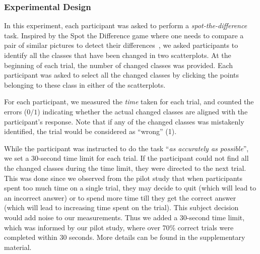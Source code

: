
\subsubsection{Experimental Design}

\vspace{.3em}
In this experiment, each participant was asked to perform a \emph{spot-the-difference} task. Inspired by the Spot the Difference game where one needs to compare a pair of similar pictures to detect their differences~\cite{Fukuba2009}, we asked participants to identify all the classes that have been changed in two scatterplots. At the beginning of each trial, the number of changed classes was provided. Each participant was asked to select all the changed classes by clicking the points belonging to these class in either of the scatterplots.

For each participant, we measured the \emph{time} taken for each trial, and counted the  errors ($0/1$) indicating whether the actual changed classes are aligned with the participant's response. Note that if any of the changed classes was mistakenly identified, the trial would be considered as ``wrong'' (1).

While the participant was instructed to do the task ``\emph{as accurately as possible}'', we set a 30-second time limit for each trial. If the participant could not find all the changed classes during the time limit, they were directed to the next trial.
This was done since we observed from the pilot study that when participants spent too much time on a single trial, they may decide to quit (which will lead to an incorrect answer) or to spend more time till they get the correct answer (which will lead to increasing time spent on the trial). This subject decision would add noise to our measurements. Thus we added a 30-second time limit, which was informed by our pilot study, where over 70\% correct trials were completed within $30$ seconds. More details can be found in the supplementary material.


